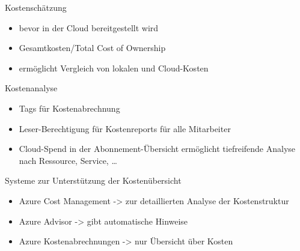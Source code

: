 

\begin{flashcard}[Definition]{Kostenschätzung}
  \begin{itemize}
    \item bevor in der Cloud bereitgestellt wird
    \item Gesamtkosten/Total Cost of Ownership
    \item ermöglicht Vergleich von lokalen und Cloud-Kosten
  \end{itemize}
\end{flashcard}

\begin{flashcard}[Definition]{Kostenanalyse}
  \begin{itemize}
    \item Tags für Kostenabrechnung
    \item Leser-Berechtigung für Kostenreports für alle Mitarbeiter
    \item Cloud-Spend in der Abonnement-Übersicht\newline
      ermöglicht tiefreifende Analyse nach Ressource, Service, \ldots
  \end{itemize}
\end{flashcard}

\begin{flashcard}[Definition]{Systeme zur Unterstützung der Kostenübersicht}
  \begin{itemize}
    \item Azure Cost Management -> zur detaillierten Analyse der Kostenstruktur
    \item Azure Advisor -> gibt automatische Hinweise
    \item Azure Kostenabrechnungen -> nur Übersicht über Kosten
  \end{itemize}
\end{flashcard}

